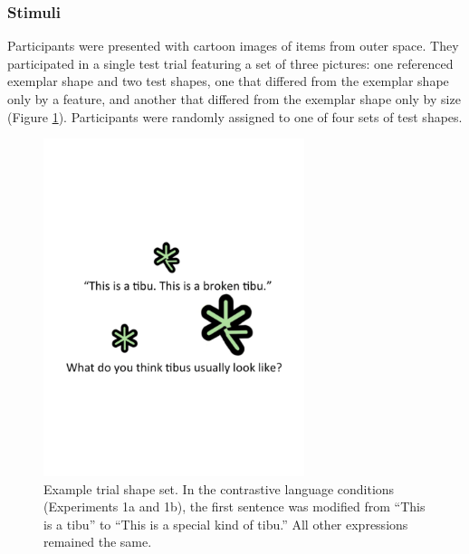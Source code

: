 \documentclass[10pt,letterpaper]{article}
\begin{document}
\subsubsection{Stimuli}

Participants were presented with cartoon images of items from outer space. They participated in a single test trial featuring a set of three pictures: one referenced exemplar shape and two test shapes, one that differed from the exemplar shape only by a feature, and another that differed from the exemplar shape only by size (Figure \ref{fig:demo}).  Participants were randomly assigned to one of four sets of test shapes.  


\begin{figure}[t] 
  \begin{center} 
    \includegraphics[width=3in]{figures/demo.pdf} 
    \caption{\label{fig:demo} Example trial shape set.  In the contrastive language conditions (Experiments 1a and 1b), the first sentence was modified from ``This is a tibu'' to ``This is a special kind of tibu.''  All other expressions remained the same. }
  \end{center} 
\end{figure}
	
\end{document}
